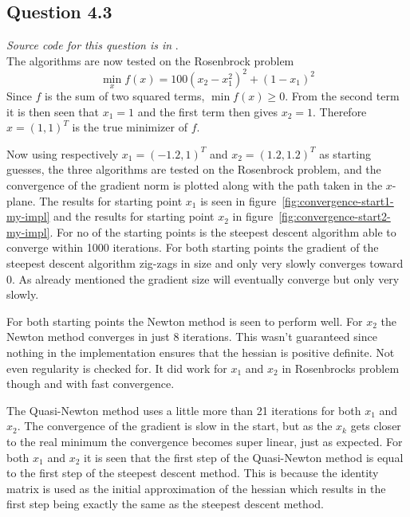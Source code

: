 \subsection*{Question 4.3}
\textit{Source code for this question is in }. \\
The algorithms are now tested on the Rosenbrock problem
\begin{equation*}
    \min_x f(x) = 100(x_2 - x_1^2)^2 + (1-x_1)^2
\end{equation*}
Since $f$ is the sum of two squared terms, $\min f(x) \geq 0$. From the second term it is then seen that $x_1=1$ and the first term then gives $x_2=1$. Therefore $x=(1,1)^T$ is the true minimizer of $f$. \par
Now using respectively $x_1 = (-1.2, 1)^T$ and $x_2=(1.2, 1.2)^T$ as starting guesses, the three algorithms are tested on the Rosenbrock problem, and the convergence of the gradient norm is plotted along with the path taken in the $x$-plane. The results for starting point $x_1$ is seen in figure~\ref{fig:convergence-start1-my-impl} and the results for starting point $x_2$ in figure~\ref{fig:convergence-start2-my-impl}. For no of the starting points is the steepest descent algorithm able to converge within 1000 iterations. For both starting points the gradient of the steepest descent algorithm zig-zags in size and only very slowly converges toward 0. As already mentioned the gradient size will eventually converge but only very slowly. \par
For both starting points the Newton method is seen to perform well. For $x_2$ the Newton method converges in just 8 iterations. This wasn't guaranteed since nothing in the implementation ensures that the hessian is positive definite. Not even regularity is checked for. It did work for $x_1$ and $x_2$ in Rosenbrocks problem though and with fast convergence. \par
The Quasi-Newton method uses a little more than 21 iterations for both $x_1$ and $x_2$. The convergence of the gradient is slow in the start, but as the $x_k$ gets closer to the real minimum the convergence becomes super linear, just as expected. For both $x_1$ and $x_2$ it is seen that the first step of the Quasi-Newton method is equal to the first step of the steepest descent method. This is because the identity matrix is used as the initial approximation of the hessian which results in the first step being exactly the same as the steepest descent method.

